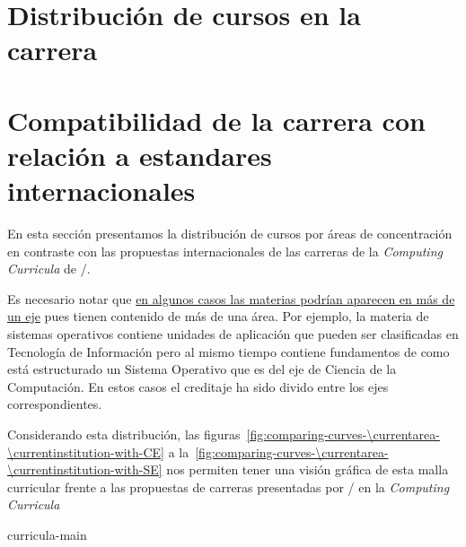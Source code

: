 \begin{btUnit}
\begin{landscape}
\end{landscape}



\section{Distribución de cursos en la carrera}

\section{Compatibilidad de la carrera con relación a estandares internacionales}
En esta sección presentamos la distribución de cursos por áreas de concentración en 
contraste con las propuestas internacionales de las carreras de la \textit{Computing Curricula} 
de /.

Es necesario notar que \underline{en algunos casos las materias podrí­an aparecen en más de un eje} 
pues tienen contenido de más de una área. 
Por ejemplo, la materia de sistemas operativos contiene unidades de aplicación 
que pueden ser clasificadas en Tecnologí­a de Información pero al mismo tiempo contiene fundamentos 
de como está estructurado un Sistema Operativo que es del eje de Ciencia de la Computación. 
En estos casos el creditaje ha sido divido entre los ejes correspondientes.


Considerando esta distribución, las figuras~\ref{fig:comparing-curves-\currentarea-\currentinstitution-with-CE} 
a la~\ref{fig:comparing-curves-\currentarea-\currentinstitution-with-SE} 
nos permiten tener una visión gráfica de esta malla curricular frente a las propuestas de 
carreras presentadas por / en la \textit{Computing Curricula}



\begin{btSect}[apalike]{curricula-main}
\section*{\BibliographySection}
\btPrintCited
\end{btSect}
\end{btUnit}
  
